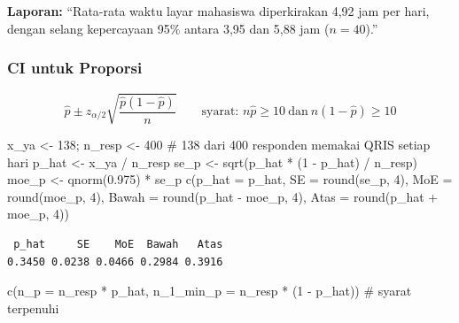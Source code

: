 \documentclass[
  indonesian,
  letterpaper,
]{book}
\newenvironment{Shaded}{\begin{snugshade}}{\end{snugshade}}
\newcommand{\AttributeTok}[1]{\textcolor[rgb]{0.40,0.45,0.13}{#1}}
\newcommand{\CommentTok}[1]{\textcolor[rgb]{0.37,0.37,0.37}{#1}}
\newcommand{\DecValTok}[1]{\textcolor[rgb]{0.68,0.00,0.00}{#1}}
\newcommand{\FloatTok}[1]{\textcolor[rgb]{0.68,0.00,0.00}{#1}}
\newcommand{\FunctionTok}[1]{\textcolor[rgb]{0.28,0.35,0.67}{#1}}
\newcommand{\NormalTok}[1]{\textcolor[rgb]{0.00,0.23,0.31}{#1}}
\newcommand{\OtherTok}[1]{\textcolor[rgb]{0.00,0.23,0.31}{#1}}
\newcommand{\SpecialCharTok}[1]{\textcolor[rgb]{0.37,0.37,0.37}{#1}}
\begin{document}
\textbf{Laporan:} ``Rata-rata waktu layar mahasiswa diperkirakan 4,92
jam per hari, dengan selang kepercayaan 95\% antara 3,95 dan 5,88 jam
(\(n = 40\)).''

\subsubsection{CI untuk Proporsi}\label{ci-untuk-proporsi}

\[
\hat{p} \pm z_{\alpha/2}\sqrt{\frac{\hat{p}(1-\hat{p})}{n}}
\qquad \text{syarat: } n\hat{p} \ge 10 \ \text{dan}\ n(1-\hat{p}) \ge 10
\]

\begin{Shaded}
\begin{Highlighting}[]
\NormalTok{x\_ya }\OtherTok{\textless{}{-}} \DecValTok{138}\NormalTok{; n\_resp }\OtherTok{\textless{}{-}} \DecValTok{400}    \CommentTok{\# 138 dari 400 responden memakai QRIS setiap hari}
\NormalTok{p\_hat }\OtherTok{\textless{}{-}}\NormalTok{ x\_ya }\SpecialCharTok{/}\NormalTok{ n\_resp}
\NormalTok{se\_p  }\OtherTok{\textless{}{-}} \FunctionTok{sqrt}\NormalTok{(p\_hat }\SpecialCharTok{*}\NormalTok{ (}\DecValTok{1} \SpecialCharTok{{-}}\NormalTok{ p\_hat) }\SpecialCharTok{/}\NormalTok{ n\_resp)}
\NormalTok{moe\_p }\OtherTok{\textless{}{-}} \FunctionTok{qnorm}\NormalTok{(}\FloatTok{0.975}\NormalTok{) }\SpecialCharTok{*}\NormalTok{ se\_p}
\FunctionTok{c}\NormalTok{(}\AttributeTok{p\_hat =}\NormalTok{ p\_hat, }\AttributeTok{SE =} \FunctionTok{round}\NormalTok{(se\_p, }\DecValTok{4}\NormalTok{), }\AttributeTok{MoE =} \FunctionTok{round}\NormalTok{(moe\_p, }\DecValTok{4}\NormalTok{),}
  \AttributeTok{Bawah =} \FunctionTok{round}\NormalTok{(p\_hat }\SpecialCharTok{{-}}\NormalTok{ moe\_p, }\DecValTok{4}\NormalTok{), }\AttributeTok{Atas =} \FunctionTok{round}\NormalTok{(p\_hat }\SpecialCharTok{+}\NormalTok{ moe\_p, }\DecValTok{4}\NormalTok{))}
\end{Highlighting}
\end{Shaded}

\begin{verbatim}
 p_hat     SE    MoE  Bawah   Atas 
0.3450 0.0238 0.0466 0.2984 0.3916 
\end{verbatim}

\begin{Shaded}
\begin{Highlighting}[]
\FunctionTok{c}\NormalTok{(}\AttributeTok{n\_p =}\NormalTok{ n\_resp }\SpecialCharTok{*}\NormalTok{ p\_hat, }\AttributeTok{n\_1\_min\_p =}\NormalTok{ n\_resp }\SpecialCharTok{*}\NormalTok{ (}\DecValTok{1} \SpecialCharTok{{-}}\NormalTok{ p\_hat))   }\CommentTok{\# syarat terpenuhi}
\end{Highlighting}
\end{Shaded}
\end{document}
